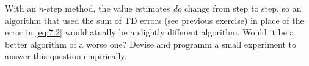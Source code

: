 
\begin{exercise}

With an $n$-step method, the value estimates \textit{do} change from step to step, so an algorithm that used the sum of TD errors (see previous exercise) in place of the error in \eqref{eq:7.2} would atually be a slightly different algorithm.
Would it be a better algorithm of a worse one?
Devise and programm a small experiment to answer this question empirically.

\end{exercise}


\begin{solution}

\phantom{}

\end{solution}

